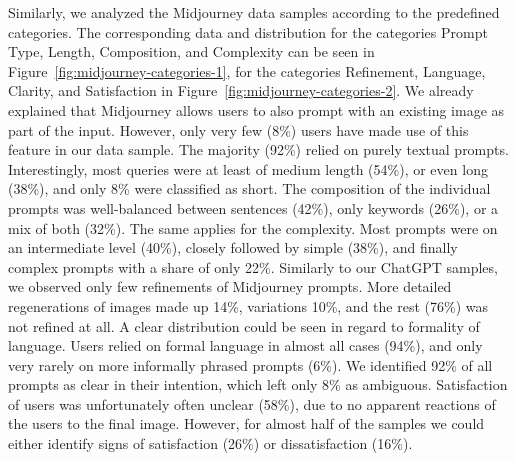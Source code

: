 Similarly, we analyzed the Midjourney data samples according to the predefined categories.
The corresponding data and distribution for the categories Prompt Type, Length, Composition, and
Complexity can be seen in Figure~\ref{fig:midjourney-categories-1}, for the categories Refinement, Language, Clarity, and Satisfaction in Figure~\ref{fig:midjourney-categories-2}.
We already explained that Midjourney allows users to also prompt with an existing image as part of
the input.
However, only very few (8\%) users have made use of this feature in our data sample.
The majority (92\%) relied on purely textual prompts.
Interestingly, most queries were at least of medium length (54\%), or even long (38\%), and only 8\%
were classified as short.
The composition of the individual prompts was well-balanced between sentences (42\%), only keywords
(26\%), or a mix of both (32\%).
The same applies for the complexity.
Most prompts were on an intermediate level (40\%), closely followed by simple (38\%), and finally
complex prompts with a share of only 22\%.
Similarly to our ChatGPT samples, we observed only few refinements of Midjourney prompts.
More detailed regenerations of images made up 14\%, variations 10\%, and the rest (76\%) was not
refined
at all.
A clear distribution could be seen in regard to formality of language.
Users relied on formal language in almost all cases (94\%), and only very rarely on more informally
phrased prompts (6\%).
We identified 92\% of all prompts as clear in their intention, which left only 8\% as ambiguous.
Satisfaction of users was unfortunately often unclear (58\%), due to no apparent reactions of the
users to the final image.
However, for almost half of the samples we could either identify signs of satisfaction (26\%) or
dissatisfaction (16\%).

